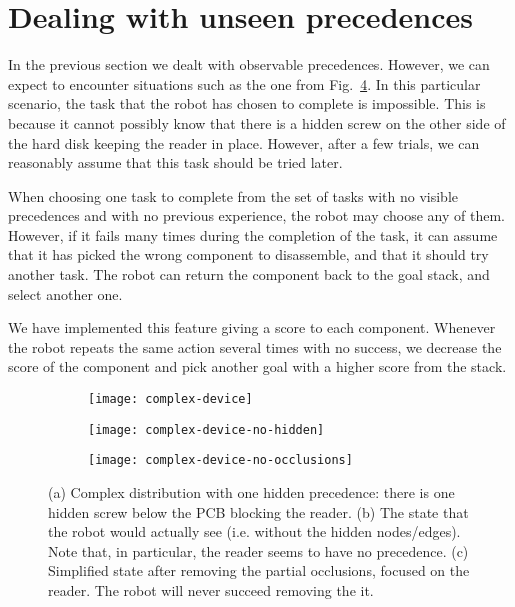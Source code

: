 \documentclass[../root.tex]{subfiles}
\begin{document}
\section{Dealing with unseen precedences}

In the previous section we dealt with observable precedences. However, we can
expect to encounter situations such as the one from Fig.~\ref{fig:complex-device}.
In this particular scenario, the task that the robot has chosen to complete is impossible.
This is because it cannot possibly know that there is a hidden screw on the other side
of the hard disk keeping the reader in place. However, after a few trials, we can reasonably
assume that this task should be tried later.

When choosing one task to complete from the set of tasks with no visible precedences and
with no previous experience, the robot may choose any of them. However, if it fails many
times during the completion of the task, it can assume that it has picked the wrong
component to disassemble, and that it should try another task. The robot can return the
component back to the goal stack, and select another one.

We have implemented this feature giving a score to each component. Whenever the robot repeats
the same action several times with no success, we decrease the score of the component and
pick another goal with a higher score from the stack.

\begin{figure}[tbhp]
	\centering
	\begin{subfigure}[b]{0.77\columnwidth}
		\texttt{[image: complex-device]}
		\caption{}
		\label{fig:complex-device-all}
	\end{subfigure}

	\vspace{0.5cm}

	\begin{subfigure}[b]{0.75\columnwidth}
		\texttt{[image: complex-device-no-hidden]}
		\caption{}
		\label{fig:complex-device-no-hidden}
	\end{subfigure}

	\vspace{0.5cm}

	\begin{subfigure}[b]{0.60\columnwidth}
		\texttt{[image: complex-device-no-occlusions]}
		\caption{}
		\label{fig:complex-device-no-occlusions}
	\end{subfigure}
	\caption{
		(a) Complex distribution with one hidden precedence: there is one hidden
			screw below the PCB blocking the reader.
		(b) The state that the robot would actually see (i.e. without the
			hidden nodes/edges). Note that, in particular, the reader seems
			to have no precedence.
        (c) Simplified state after removing the partial occlusions, focused on the
			reader. The robot will never succeed removing the it.
	}
	\label{fig:complex-device}
\end{figure}

\end{document}
